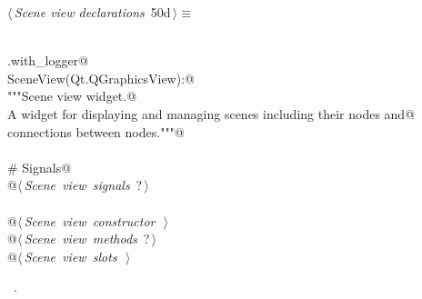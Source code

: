 \documentclass[
    a4paper,      %
    10pt,         %
    openright,    %
    notitlepage,  %
    parskip=half, %
]{scrreprt}       %
\theoremstyle{definition}                    %
\begin{document}
\begin{flushleft} \small
\begin{minipage}{\linewidth}\label{scrap72}\raggedright\small
{} $\langle\,${\itshape Scene view declarations}\nobreak\ {\footnotesize {50d}}$\,\rangle\equiv$
\vspace{-1exm}
\begin{list}{}{} \item
\mbox{}\lstinline@@\\
\mbox{}\lstinline@common.with_logger@\\
\mbox{}\lstinline@class SceneView(Qt.QGraphicsView):@\\
\mbox{}\lstinline@    """Scene view widget.@\\
\mbox{}\lstinline@    A widget for displaying and managing scenes including their nodes and@\\
\mbox{}\lstinline@    connections between nodes."""@\\
\mbox{}\lstinline@@\\
\mbox{}\lstinline@    # Signals@\\
\mbox{}\lstinline@    @\hbox{$\langle\,${\itshape Scene view signals}\nobreak\ {\footnotesize ?}$\,\rangle$}\lstinline@@\\
\mbox{}\lstinline@@\\
\mbox{}\lstinline@    @\hbox{$\langle\,${\itshape Scene view constructor}\nobreak\ {\footnotesize {}}$\,\rangle$}\lstinline@@\\
\mbox{}\lstinline@    @\hbox{$\langle\,${\itshape Scene view methods}\nobreak\ {\footnotesize ?}$\,\rangle$}\lstinline@@\\
\mbox{}\lstinline@    @\hbox{$\langle\,${\itshape Scene view slots}\nobreak\ {\footnotesize {}}$\,\rangle$}\lstinline@@\\
\mbox{}\lstinline@@{\NWsep}
\end{list}
\vspace{-1.5ex}
\footnotesize
\begin{list}{}{\setlength{\itemsep}{-\parsep}\setlength{\itemindent}{-\leftmargin}}
\item \NWtxtMacroRefIn\ .

\item{}
\end{list}
\end{minipage}\vspace{4ex}
\end{flushleft}
\end{document}
